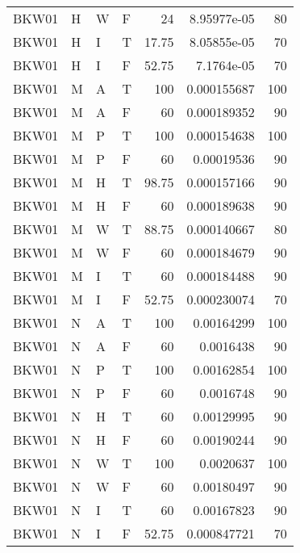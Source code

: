 \begin{table}[htb!]
{\begin{tabular}{llllrrr}
            BKW01    & H     & W     & F          & 24         & 8.95977e-05 & 80       \\
            BKW01    & H     & I     & T          & 17.75      & 8.05855e-05 & 70       \\
            BKW01    & H     & I     & F          & 52.75      & 7.1764e-05  & 70       \\
            BKW01    & M     & A     & T          & 100        & 0.000155687 & 100      \\
            BKW01    & M     & A     & F          & 60         & 0.000189352 & 90       \\
            BKW01    & M     & P     & T          & 100        & 0.000154638 & 100      \\
            BKW01    & M     & P     & F          & 60         & 0.00019536  & 90       \\
            BKW01    & M     & H     & T          & 98.75      & 0.000157166 & 90       \\
            BKW01    & M     & H     & F          & 60         & 0.000189638 & 90       \\
            BKW01    & M     & W     & T          & 88.75      & 0.000140667 & 80       \\
            BKW01    & M     & W     & F          & 60         & 0.000184679 & 90       \\
            BKW01    & M     & I     & T          & 60         & 0.000184488 & 90       \\
            BKW01    & M     & I     & F          & 52.75      & 0.000230074 & 70       \\
            BKW01    & N     & A     & T          & 100        & 0.00164299  & 100      \\
            BKW01    & N     & A     & F          & 60         & 0.0016438   & 90       \\
            BKW01    & N     & P     & T          & 100        & 0.00162854  & 100      \\
            BKW01    & N     & P     & F          & 60         & 0.0016748   & 90       \\
            BKW01    & N     & H     & T          & 60         & 0.00129995  & 90       \\
            BKW01    & N     & H     & F          & 60         & 0.00190244  & 90       \\
            BKW01    & N     & W     & T          & 100        & 0.0020637   & 100      \\
            BKW01    & N     & W     & F          & 60         & 0.00180497  & 90       \\
            BKW01    & N     & I     & T          & 60         & 0.00167823  & 90       \\
            BKW01    & N     & I     & F          & 52.75      & 0.000847721 & 70       \\
            \hline
        \end{tabular}
    }{
    }
\end{table} 

